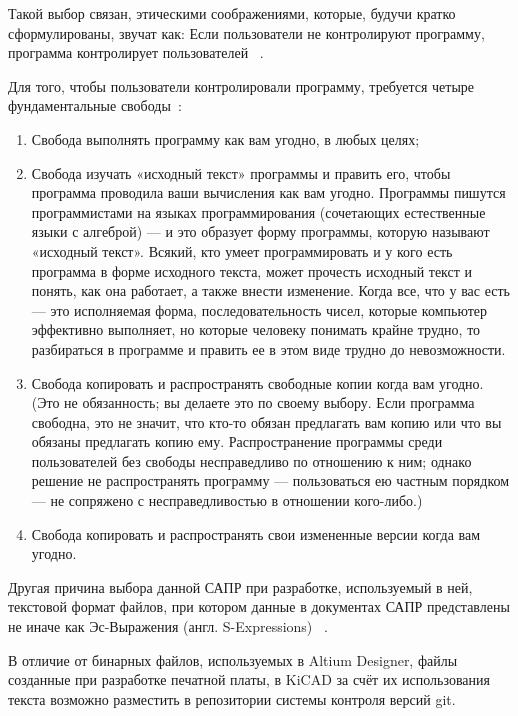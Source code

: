 Такой выбор связан, этическими соображениями, которые, будучи
кратко сформулированы, звучат как:
Если пользователи не контролируют программу,
программа контролирует пользователей ~\cite{unfair-nonfree-programms}.

Для того, чтобы пользователи контролировали программу, требуется
четыре фундаментальные свободы~\cite{unfair-nonfree-programms}:

\begin{enumerate}
\item Свобода выполнять программу как вам угодно, в любых целях;
  
\item Свобода изучать «исходный текст» программы и править его, чтобы
программа проводила ваши вычисления как вам угодно. Программы пишутся
программистами на языках программирования (сочетающих естественные
языки с алгеброй) — и это образует форму программы, которую называют
«исходный текст». Всякий, кто умеет программировать и у кого есть
программа в форме исходного текста, может прочесть исходный текст и
понять, как она работает, а также внести изменение. Когда все, что у
вас есть — это исполняемая форма, последовательность чисел, которые
компьютер эффективно выполняет, но которые человеку понимать крайне
трудно, то разбираться в программе и править ее в этом виде трудно до
невозможности.

\item  Свобода копировать и распространять свободные копии когда вам
угодно. (Это не обязанность; вы делаете это по своему выбору. Если
программа свободна, это не значит, что кто-то обязан предлагать вам
копию или что вы обязаны предлагать копию ему. Распространение
программы среди пользователей без свободы несправедливо по отношению к
ним; однако решение не распространять программу — пользоваться ею
частным порядком — не сопряжено с несправедливостью в отношении
кого-либо.)

\item Свобода копировать и распространять свои измененные версии когда
вам угодно.
\end{enumerate}

Другая причина выбора данной САПР при разработке,
используемый в ней, текстовой формат файлов,
при котором данные в документах САПР представлены
не иначе как Эс-Выражения (англ. S-Expressions)
~\cite{kicad-sexpr}.

В отличие от бинарных файлов,
используемых в Altium Designer,
файлы созданные при разработке печатной платы,
в KiCAD за счёт их использования текста
возможно разместить в репозитории системы контроля версий
git.

